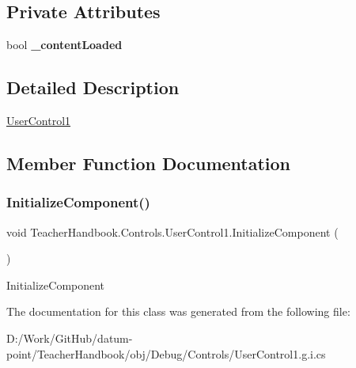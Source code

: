 \subsection*{Private Attributes}
\begin{DoxyCompactItemize}
\item 
\mbox{\label{class_teacher_handbook_1_1_controls_1_1_user_control1_a57070769f7910e144693661a022177be}} 
bool {\bfseries \+\_\+content\+Loaded}
\end{DoxyCompactItemize}


\subsection{Detailed Description}
\mbox{\hyperlink{class_teacher_handbook_1_1_controls_1_1_user_control1}{User\+Control1}} 



\subsection{Member Function Documentation}
\mbox{\label{class_teacher_handbook_1_1_controls_1_1_user_control1_afbcb7046a6000b1f69c161bb9e5c69b2}} 
\subsubsection{\texorpdfstring{Initialize\+Component()}{InitializeComponent()}}
{\footnotesize\ttfamily void Teacher\+Handbook.\+Controls.\+User\+Control1.\+Initialize\+Component (\begin{DoxyParamCaption}{ }\end{DoxyParamCaption})}



Initialize\+Component 



The documentation for this class was generated from the following file\+:\begin{DoxyCompactItemize}
\item 
D\+:/\+Work/\+Git\+Hub/datum-\/point/\+Teacher\+Handbook/obj/\+Debug/\+Controls/User\+Control1.\+g.\+i.\+cs\end{DoxyCompactItemize}
